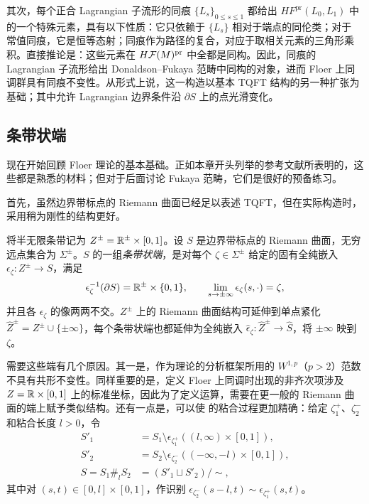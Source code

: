 其次，每个正合 Lagrangian 子流形的同痕 $\{L_s\}_{0\leq s\leq1}$ 都给出 $HF^{\mathrm{pr}}(L_0,L_1)$ 中的一个特殊元素，具有以下性质：它只依赖于 $\{L_s\}$ 相对于端点的同伦类；对于
常值同痕，它是恒等态射；同痕作为路径的复合，对应于取相关元素的三角形乘积。直接推论是：这些元素在 $H\mathcal F(M)^{\mathrm{pr}}$ 中全都是同构。因此，同痕的 Lagrangian 子流形给出 Donaldson–Fukaya 范畴中同构的对象，进而 Floer 上同调群具有同痕不变性。从形式上说，这一构造以基本 TQFT 结构的另一种扩张为基础；其中允许 Lagrangian 边界条件沿 $\partial S$ 上的点光滑变化。

\subsection{条带状端}\label{sec:8d}
现在开始回顾 Floer 理论的基本基础。正如本章开头列举的参考文献所表明的，这些都是熟悉的材料；但对于后面讨论 Fukaya 范畴，它们是很好的预备练习。

首先，虽然边界带标点的 Riemann 曲面已经足以表述 TQFT，但在实际构造时，采用稍为刚性的结构更好。
\begin{definition*}
将半无限条带记为 $Z^\pm=\mathbb R^\pm\times[0,1]$。设 $S$ 是边界带标点的 Riemann 曲面，无穷远点集合为 $\Sigma^\pm$。$S$ 的一组\emph{条带状端}，是对每个 $\zeta\in\Sigma^\pm$ 给定的固有全纯嵌入 $\epsilon_\zeta:Z^\pm\to S$，满足
\[
\epsilon_\zeta^{-1}(\partial S)=\mathbb R^\pm\times\{0,1\},\qquad
\lim_{s\to\pm\infty}\epsilon_\zeta(s,\cdot)=\zeta,
\]
并且各 $\epsilon_\zeta$ 的像两两不交。$Z^\pm$ 上的 Riemann 曲面结构可延伸到单点紧化 $\widehat Z^\pm=Z^\pm\cup\{\pm\infty\}$，每个条带状端也都延伸为全纯嵌入 $\widehat\epsilon_\zeta:\widehat Z^\pm\to\widehat S$，将 $\pm\infty$ 映到 $\zeta$。
\end{definition*}
需要这些端有几个原因。其一是，作为理论的分析框架所用的 $W^{1,p}$（$p>2$）范数不具有共形不变性。同样重要的是，定义 Floer 上同调时出现的非齐次项涉及 $Z=\mathbb R\times[0,1]$ 上的标准坐标，因此为了定义运算，需要在更一般的 Riemann 曲面的端上赋予类似结构。还有一点是，可以使 的粘合过程更加精确：给定 $\zeta_1^+$、$\zeta_2^-$ 和粘合长度 $l>0$，令
\begin{equation}\label{eq:8.5}
\begin{aligned}
S'_1&=S_1\setminus\epsilon_{\zeta_1^+}((l,\infty)\times[0,1]),\\
S'_2&=S_2\setminus\epsilon_{\zeta_2^-}((-\infty,-l)\times[0,1]),\\
S=S_1\#_l S_2&=(S'_1\sqcup S'_2)/\sim,
\end{aligned}
\end{equation}
其中对 $(s,t)\in[0,l]\times[0,1]$，作识别 $\epsilon_{\zeta_2^-}(s-l,t)\sim\epsilon_{\zeta_1^+}(s,t)$。

